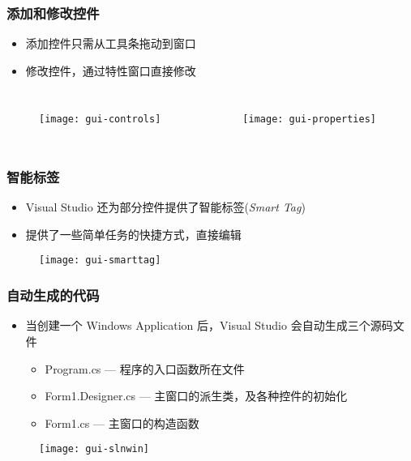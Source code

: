 \begin{frame}
\frametitle{添加和修改控件}
\begin{itemize}
\item 添加控件只需从工具条拖动到窗口
\item 修改控件，通过特性窗口直接修改
\end{itemize}
\begin{columns}
  \begin{figure}[htbp]
    \centering
    \texttt{[image: gui-controls]}
  \end{figure}
  \begin{figure}[htbp]
    \centering
    \texttt{[image: gui-properties]}
  \end{figure}
\end{columns}
\end{frame}

\begin{frame}
\frametitle{智能标签}
\begin{itemize}
\item Visual Studio 还为部分控件提供了智能标签(\textit{Smart Tag})
\item 提供了一些简单任务的快捷方式，直接编辑
\end{itemize}
\begin{figure}[htbp]
  \centering
  \texttt{[image: gui-smarttag]}
\end{figure}
\end{frame}

\begin{frame}
\frametitle{自动生成的代码}
\begin{itemize}
\item 当创建一个 Windows Application 后，Visual Studio 会自动生成三个源码文件
\begin{itemize}
\item Program.cs --- 程序的入口函数所在文件
\item Form1.Designer.cs --- 主窗口的派生类，及各种控件的初始化
\item Form1.cs --- 主窗口的构造函数
\end{itemize}
\end{itemize}
\begin{figure}[htbp]
  \centering
  \texttt{[image: gui-slnwin]}
\end{figure}
\end{frame}


